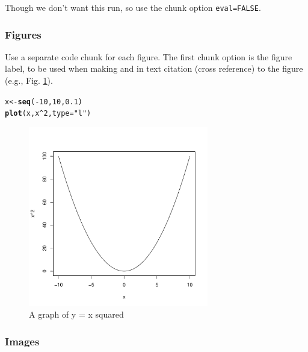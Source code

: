 \documentclass[10pt,a4paper]{book}\usepackage[]{graphicx}\usepackage[]{color}
\makeatletter
\newcommand{\hlnum}[1]{\textcolor[rgb]{0.686,0.059,0.569}{#1}}%
\newcommand{\hlstr}[1]{\textcolor[rgb]{0.192,0.494,0.8}{#1}}%
\newcommand{\hlopt}[1]{\textcolor[rgb]{0,0,0}{#1}}%
\newcommand{\hlstd}[1]{\textcolor[rgb]{0.345,0.345,0.345}{#1}}%
\newcommand{\hlkwb}[1]{\textcolor[rgb]{0.69,0.353,0.396}{#1}}%
\newcommand{\hlkwc}[1]{\textcolor[rgb]{0.333,0.667,0.333}{#1}}%
\newcommand{\hlkwd}[1]{\textcolor[rgb]{0.737,0.353,0.396}{\textbf{#1}}}%
\newenvironment{kframe}{%
 \def\at@end@of@kframe{}%
 \ifinner\ifhmode%
  \def\at@end@of@kframe{\end{minipage}}%
  \begin{minipage}{\columnwidth}%
 \fi\fi%
 \def\FrameCommand##1{\hskip\@totalleftmargin \hskip-\fboxsep
 \colorbox{shadecolor}{##1}\hskip-\fboxsep
     \hskip-\linewidth \hskip-\@totalleftmargin \hskip\columnwidth}%
 \MakeFramed {\advance\hsize-\width
   \@totalleftmargin\z@ \linewidth\hsize
   \@setminipage}}%
 {\par\unskip\endMakeFramed%
 \at@end@of@kframe}
\newenvironment{knitrout}{}{} %
\makeatother
\begin{document}
Though we don't want this run, so use the chunk option \texttt{eval=FALSE}.

\subsubsection{Figures}

Use a separate code chunk for each figure. The first chunk option is the figure label, to be used when making and in text citation (cross reference) to the figure (e.g., Fig. \ref{fig:x_y_squared}).

\begin{knitrout}
\color{fgcolor}\begin{kframe}
\begin{alltt}
\hlstd{x} \hlkwb{<-} \hlkwd{seq}\hlstd{(}\hlopt{-}\hlnum{10}\hlstd{,} \hlnum{10}\hlstd{,} \hlnum{0.1}\hlstd{)}
\hlkwd{plot}\hlstd{(x, x}\hlopt{^}\hlnum{2}\hlstd{,} \hlkwc{type}\hlstd{=}\hlstr{"l"}\hlstd{)}
\end{alltt}
\end{kframe}\begin{figure}[H]

{\centering \includegraphics[width=0.7\textwidth]{figure/x_y_squared-1} 

}

\caption[A graph of y = x squared]{A graph of y = x squared}\label{fig:x_y_squared}
\end{figure}


\end{knitrout}


\subsubsection{Images}
\end{document}
